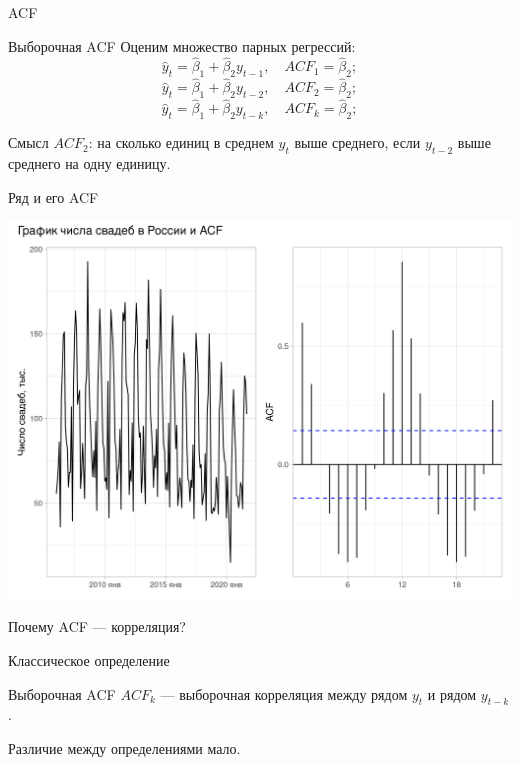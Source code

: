 \begin{frame}{ACF}

\begin{block}{Выборочная ACF}
  Оценим множество парных регрессий:
  \[
  \hat y_t = \hat\beta_1 + \hat\beta_2 y_{t-1}, \quad ACF_1 = \hat\beta_2;
  \]
  \pause
  \[
    \hat y_t = \hat\beta_1 + \hat\beta_2 y_{t-2}, \quad ACF_2 = \hat\beta_2;
  \]
  \pause
  \[
    \hat y_t = \hat\beta_1 + \hat\beta_2 y_{t-k}, \quad ACF_k = \hat\beta_2;
  \]
\end{block}

\pause
\alert{Смысл}
$ACF_2$: на сколько единиц в среднем $y_t$ выше среднего, если $y_{t-2}$ выше среднего на одну единицу.

\end{frame}


\begin{frame}{Ряд и его ACF}

  \includegraphics[width=\textwidth]{pictures/om_ts_01-120.png}

\end{frame}

\begin{frame}{Почему ACF — корреляция?}

  \alert{Классическое определение}

  \begin{block}{Выборочная ACF}
    $ACF_k$ — выборочная корреляция между рядом $y_t$ и рядом $y_{t-k}$.
  \end{block}

\pause
Различие между определениями \alert{мало}. 

\end{frame}


